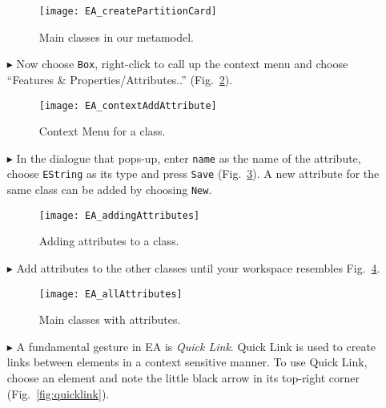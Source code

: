 \begin{enumerate}
\begin{figure}[htbp]
	\centering
  \texttt{[image: EA\_createPartitionCard]}
	\caption{Main classes in our metamodel.}
	\label{fig:all_eclasses}
\end{figure}

\pagebreak

\item[$\blacktriangleright$] Now choose \texttt{Box}, right-click to call up the context menu and choose ``Features \& Properties/Attributes..'' (Fig.~\ref{fig:attribute}).

\begin{figure}[htbp]
	\centering
  \texttt{[image: EA\_contextAddAttribute]}
	\caption{Context Menu for a class.}
	\label{fig:attribute}
\end{figure}
\FloatBarrier

\vspace{0.5cm}

\item[$\blacktriangleright$] In the dialogue that pops-up, enter \texttt{name} as the name of the attribute, choose \texttt{EString} as its type and press \texttt{Save} (Fig.~\ref{fig:attribute_properties}).
A new attribute for the same class can be added by choosing \texttt{New}.

\vspace{0.5cm}

\begin{figure}[htbp]
	\centering
  \texttt{[image: EA\_addingAttributes]}
	\caption{Adding attributes to a class.}
	\label{fig:attribute_properties}
\end{figure}

\pagebreak

\item[$\blacktriangleright$] Add attributes to the other classes until your workspace resembles
Fig.~\ref{fig:attribute_completed}.

\begin{figure}[htbp]
	\centering
  \texttt{[image: EA\_allAttributes]}
	\caption{Main classes with attributes.}
	\label{fig:attribute_completed}
\end{figure}
\FloatBarrier

\item[$\blacktriangleright$] A fundamental gesture in EA is \emph{Quick Link}.
Quick Link is used to create links between elements in a context sensitive manner.
To use Quick Link, choose an element and note the little black arrow in its top-right corner (Fig.~\ref{fig:quicklink}).


\end{enumerate}

